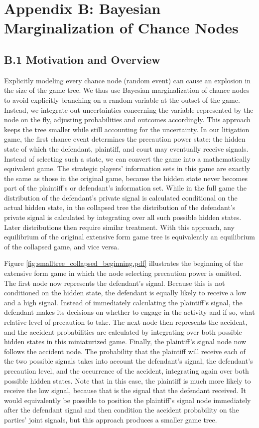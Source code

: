 \documentclass{article}
\begin{document}
\section*{Appendix B: Bayesian Marginalization of Chance Nodes}

\subsection*{B.1 Motivation and Overview}

Explicitly modeling every chance node (random event) can cause an explosion in the size of the game tree. We thus use Bayesian marginalization of chance nodes to avoid explicitly branching on a random variable at the outset of the game. Instead, we integrate out uncertainties concerning the variable represented by the node on the fly, adjusting probabilities and outcomes accordingly. This approach keeps the tree smaller while still accounting for the uncertainty. In our litigation game, the first chance event determines the precaution power state: the hidden state of which the defendant, plaintiff, and court may eventually receive signals. Instead of selecting such a state, we can convert the game into a mathematically equivalent game. The strategic players' information sets in this game are exactly the same as those in the original game, because the hidden state never becomes part of the plaintiff's or defendant's information set. While in the full game the distribution of the defendant's private signal is calculated conditional on the actual hidden state, in the collapsed tree the distribution of the defendant's private signal is calculated by integrating over all such possible hidden states. Later distributions then require similar treatment. With this approach, any equilibrium of the original extensive form game tree is equivalently an equilibrium of the collapsed game, and vice versa.

Figure \ref{fig:smalltree_collapsed_beginning.pdf} illustrates the beginning of the extensive form game in which the node selecting precaution power is omitted. The first node now represents the defendant's signal. Because this is not conditioned on the hidden state, the defendant is equally likely to receive a low and a high signal. Instead of immediately calculating the plaintiff's signal, the defendant makes its decisions on whether to engage in the activity and if so, what relative level of precaution to take. The next node then represents the accident, and the accident probabilities are calculated by integrating over both possible hidden states in this miniaturized game. Finally, the plaintiff's signal node now follows the accident node. The probability that the plaintiff will receive each of the two possible signals takes into account the defendant's signal, the defendant's precaution level, and the occurrence of the accident, integrating again over both possible hidden states. Note that in this case, the plaintiff is much more likely to receive the low signal, because that is the signal that the defendant received. It would equivalently be possible to position the plaintiff's signal node immediately after the defendant signal and then condition the accident probability on the parties' joint signals, but this approach produces a smaller game tree.
\end{document}
